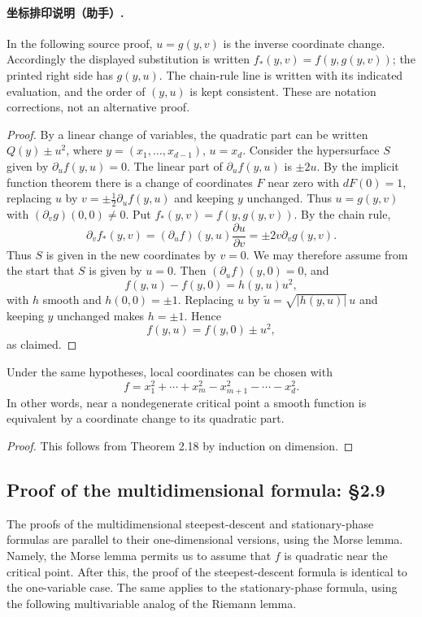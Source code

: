 \paragraph{坐标排印说明（助手）.} In the following source proof, $u=g(y,v)$ is the inverse coordinate change. Accordingly the displayed substitution is written $f_*(y,v)=f(y,g(y,v))$; the printed right side has $g(y,u)$. The chain-rule line is written with its indicated evaluation, and the order of $(y,u)$ is kept consistent. These are notation corrections, not an alternative proof.
\begin{proof}
By a linear change of variables, the quadratic part can be written $Q(y)\pm u^2$, where $y=(x_1,\ldots,x_{d-1})$, $u=x_d$. Consider the hypersurface $S$ given by $\partial_u f(y,u)=0$.
The linear part of $\partial_u f(y,u)$ is $\pm2u$. By the implicit function theorem there is a change of coordinates $F$ near zero with $dF(0)=1$, replacing $u$ by $v=\pm\tfrac12\partial_u f(y,u)$ and keeping $y$ unchanged. Thus $u=g(y,v)$ with $(\partial_vg)(0,0)\ne0$. Put $f_*(y,v)=f(y,g(y,v))$. By the chain rule,
\[
\partial_v f_*(y,v)
=(\partial_u f)(y,u)\frac{\partial u}{\partial v}
=\pm2v\partial_vg(y,v).
\]
Thus $S$ is given in the new coordinates by $v=0$. We may therefore assume from the start that $S$ is given by $u=0$. Then $(\partial_u f)(y,0)=0$, and
\[
f(y,u)-f(y,0)=h(y,u)u^2,
\]
with $h$ smooth and $h(0,0)=\pm1$. Replacing $u$ by $\widetilde u=\sqrt{|h(y,u)|}\,u$ and keeping $y$ unchanged makes $h=\pm1$. Hence
\[
f(y,u)=f(y,0)\pm u^2,
\]
as claimed.
\end{proof}

\begin{corollary}
Under the same hypotheses, local coordinates can be chosen with
\[
f=x_1^2+\cdots+x_m^2-x_{m+1}^2-\cdots-x_d^2.
\]
In other words, near a nondegenerate critical point a smooth function is equivalent by a coordinate change to its quadratic part.
\end{corollary}
\begin{proof}
This follows from Theorem 2.18 by induction on dimension.
\end{proof}

\subsection*{Proof of the multidimensional formula: §2.9}
The proofs of the multidimensional steepest-descent and stationary-phase formulas are parallel to their one-dimensional versions, using the Morse lemma. Namely, the Morse lemma permits us to assume that $f$ is quadratic near the critical point. After this, the proof of the steepest-descent formula is identical to the one-variable case. The same applies to the stationary-phase formula, using the following multivariable analog of the Riemann lemma.

